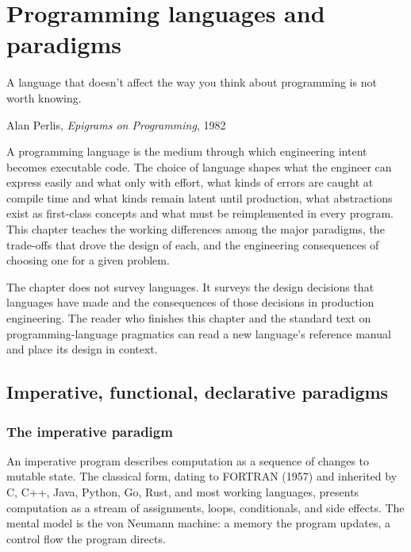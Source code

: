 \chapter{Programming languages and paradigms}
\label{vol07:ch05}

\epigraph{A language that doesn't affect the way you think about programming is not worth knowing.}{Alan Perlis, \emph{Epigrams on Programming}, 1982}


\noindent
A programming language is the medium through which engineering intent becomes executable code. The choice of language shapes what the engineer can express easily and what only with effort, what kinds of errors are caught at compile time and what kinds remain latent until production, what abstractions exist as first-class concepts and what must be reimplemented in every program. This chapter teaches the working differences among the major paradigms, the trade-offs that drove the design of each, and the engineering consequences of choosing one for a given problem.

The chapter does not survey languages. It surveys the design decisions that languages have made and the consequences of those decisions in production engineering. The reader who finishes this chapter and the standard text on programming-language pragmatics \cite{text:scott-pl-pragmatics} can read a new language's reference manual and place its design in context.

\section{Imperative, functional, declarative paradigms}

\subsection{The imperative paradigm}

An imperative program describes computation as a sequence of changes to mutable state. The classical form, dating to FORTRAN (1957) and inherited by C, C++, Java, Python, Go, Rust, and most working languages, presents computation as a stream of assignments, loops, conditionals, and side effects. The mental model is the von Neumann machine: a memory the program updates, a control flow the program directs.

